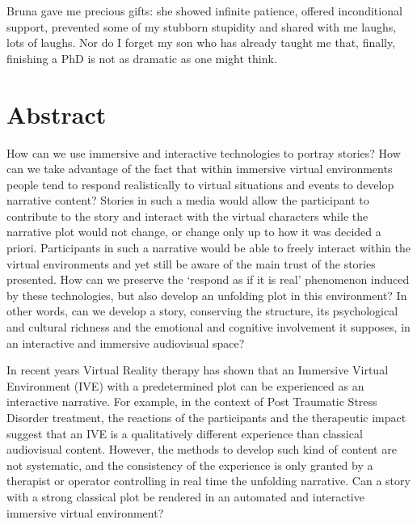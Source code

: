 \documentclass[
		twoside,openright,titlepage,numbers=noenddot,manychapters,
		headinclude,%
                footinclude=false,cleardoublepage=empty,
                BCOR=5mm,
		fontsize=11pt, %
                 enabledeprecatedfontcommands]{scrreprt}
\begin{document}
 Bruna gave me precious gifts: she showed infinite patience, offered inconditional support, prevented some of my stubborn stupidity and shared with me laughs, lots of laughs. Nor do I  forget my son who has already taught me that, finally, finishing a PhD is not as dramatic as one might think.







\cleardoublepage



\chapter*{Abstract}
{}
\thispagestyle{empty}

How can we use immersive and interactive technologies to portray stories? How can we take advantage of the fact that within immersive virtual environments people tend to respond realistically to virtual situations and events to develop narrative content? Stories in such a media would allow the participant to contribute to the story and interact with the virtual characters while the narrative plot would not change, or change only up to how it was decided a priori. Participants in such a narrative would be able to freely interact within the virtual environments and yet still be aware of the main trust of the stories presented. How can we  preserve the `respond as if it is real' phenomenon induced by these technologies, but also develop an unfolding plot in this environment? In other words, can we develop a story, conserving the structure, its psychological and cultural richness and the emotional and cognitive involvement it supposes, in an interactive and immersive audiovisual space? 

In recent years Virtual Reality therapy has shown that an Immersive Virtual Environment (IVE) with a predetermined plot can be experienced as an interactive narrative. For example, in the context of Post Traumatic Stress Disorder treatment, the reactions of the participants and the therapeutic impact suggest that an IVE is a qualitatively different experience than classical audiovisual content. However, the methods to develop such kind of content are not systematic, and the consistency of the experience is only granted by a therapist or operator controlling in real time the unfolding narrative. Can a story with a strong classical plot be rendered in an automated and interactive immersive virtual environment?
\end{document}
